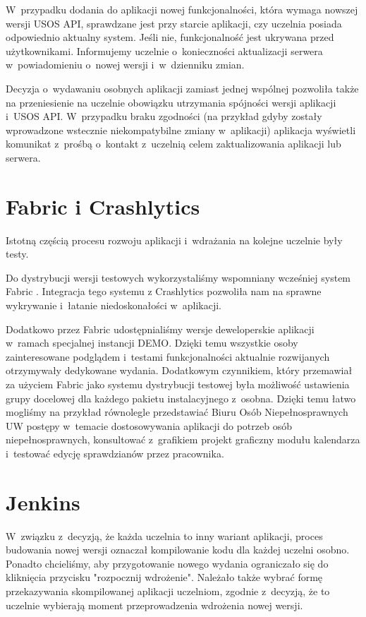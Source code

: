\documentclass{pracamgr}
\begin{document}
W~przypadku dodania do aplikacji nowej funkcjonalności, która wymaga nowszej wersji USOS API, sprawdzane jest przy starcie
aplikacji, czy uczelnia posiada odpowiednio aktualny system. Jeśli nie, funkcjonalność jest ukrywana przed użytkownikami.
Informujemy uczelnie o~konieczności aktualizacji serwera w~powiadomieniu o~nowej wersji i~w~dzienniku zmian.

Decyzja o~wydawaniu osobnych aplikacji zamiast jednej wspólnej pozwoliła także na przeniesienie na uczelnie obowiązku
utrzymania spójności wersji aplikacji i~USOS API. W~przypadku braku zgodności (na przykład gdyby zostały wprowadzone
wstecznie niekompatybilne zmiany w~aplikacji) aplikacja wyświetli komunikat z~prośbą o~kontakt z~uczelnią celem zaktualizowania
aplikacji lub serwera.

\section{Fabric i Crashlytics}

Istotną częścią procesu rozwoju aplikacji i~wdrażania na kolejne uczelnie były testy.

Do dystrybucji wersji testowych wykorzystaliśmy wspomniany wcześniej system Fabric \cite{fabric}. 
Integracja tego systemu z Crashlytics pozwoliła nam na sprawne wykrywanie i~łatanie niedoskonałości w~aplikacji.

Dodatkowo przez Fabric udostępnialiśmy wersje deweloperskie aplikacji w~ramach specjalnej instancji DEMO. Dzięki temu
wszystkie osoby zainteresowane podglądem i~testami funkcjonalności aktualnie rozwijanych otrzymywały dedykowane wydania.
Dodatkowym czynnikiem, który przemawiał za użyciem Fabric jako systemu dystrybucji testowej była możliwość ustawienia grupy
docelowej dla każdego pakietu instalacyjnego z~osobna. Dzięki temu łatwo mogliśmy na przykład równolegle przedstawiać
Biuru Osób Niepełnosprawnych UW postępy w~temacie dostosowywania aplikacji do potrzeb osób niepełnosprawnych, konsultować
z~grafikiem projekt graficzny modułu kalendarza i~testować edycję sprawdzianów przez pracownika.

\section{Jenkins}

W~związku z~decyzją, że każda uczelnia to inny wariant aplikacji, proces budowania nowej wersji oznaczał kompilowanie
kodu dla każdej uczelni osobno. Ponadto chcieliśmy, aby przygotowanie nowego wydania ograniczało się do kliknięcia przycisku
"rozpocznij wdrożenie". Należało także wybrać formę przekazywania skompilowanej aplikacji uczelniom, zgodnie
z~decyzją, że to uczelnie wybierają moment przeprowadzenia wdrożenia nowej wersji.
\end{document}
